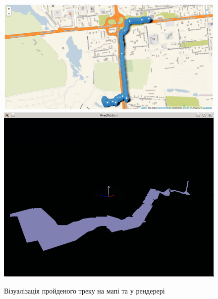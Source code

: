 \documentclass[simple,a4paper,14pt,ukrainian,utf8]{eskdtext}
\begin{document}
		\begin{figure}
			\centering \includegraphics[scale=0.35]{images/results1.png}
			\vspace{2em}
			\centering \includegraphics[scale=0.35]{images/results2.png}
			\caption{Візуалізація пройденого треку на мапі та у рендерері}
		\end{figure}

		\clearpage \newpage
		
\end{document}

